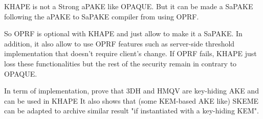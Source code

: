 \documentclass[../report.tex]{subfiles}
\begin{document}
KHAPE is not a Strong aPAKE like OPAQUE. But it can be made a SaPAKE following the aPAKE to SaPAKE compiler from \cite{OPAQUE_Paper} using OPRF.

So OPRF is optional with KHAPE and just allow to make it a SaPAKE. In addition, it also allow to use OPRF features such as server-side threshold implementation that doesn't require client's change. If OPRF fails, KHAPE just loss these functionalities but the rest of the security remain in contrary to OPAQUE.


In term of implementation, \cite{KHAPE_Paper} prove that 3DH and HMQV are key-hiding AKE and can be used in KHAPE %
It also shows that (some KEM-based AKE like) SKEME can be adapted to archive similar result "if instantiated with a key-hiding KEM". %


% 
% 








\paragraph{}
\end{document}
